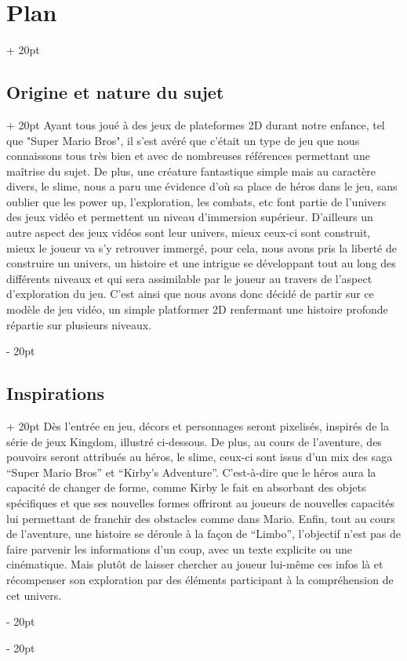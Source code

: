 \documentclass[a4paper, 12pt, twoside]{article}
\newcommand{\ind}[1][20pt]{\advance\leftskip + #1}
\newcommand{\deind}[1][20pt]{\advance\leftskip - #1}
\newenvironment{indt}[2][20pt]{#2 \par \ind[#1]}{\par \deind} %
\begin{document}
    \begin{indt}{\section{Plan}}
        \begin{indt}{\subsection{Origine et nature du sujet}}
            Ayant tous joué à des jeux de plateformes 2D durant notre enfance, tel que "Super Mario Bros", il s'est avéré que c'était un type de jeu que nous connaissons tous très bien et avec de nombreuses références permettant une maîtrise du sujet. De plus, une créature fantastique simple mais au caractère divers, le slime, nous a paru une évidence d'où sa place de héros dans le jeu, sans oublier que les power up, l'exploration, les combats, etc font partie de l'univers des jeux vidéo et permettent un niveau d'immersion supérieur. D'ailleurs un autre aspect des jeux vidéos sont leur univers, mieux ceux-ci sont construit, mieux le joueur va s'y retrouver immergé, pour cela, nous avons pris la liberté de construire un univers, un histoire et une intrigue se développant tout au long des différents niveaux et qui sera assimilable par le joueur au travers de l'aspect d'exploration du jeu. C'est ainsi que nous avons donc décidé de partir sur ce modèle de jeu vidéo, un simple platformer 2D renfermant une histoire profonde répartie sur plusieurs niveaux.
        \end{indt}

        \begin{indt}{\subsection{Inspirations}}
            Dès l'entrée en jeu, décors et personnages seront pixelisés, inspirés de la série de jeux Kingdom, illustré ci-dessous. De plus, au cours de l'aventure, des pouvoirs seront attribués au héros, le slime, ceux-ci sont issus d'un mix des saga “Super Mario Bros” et “Kirby's Adventure”. C'est-à-dire que le héros aura la capacité de changer de forme, comme Kirby le fait en absorbant des objets spécifiques et que ses nouvelles formes offriront au joueurs de nouvelles capacités lui permettant de franchir des obstacles comme dans Mario. Enfin, tout au cours de l'aventure, une histoire se déroule à la façon de “Limbo”, l'objectif n'est pas de faire parvenir les informations d'un coup, avec un texte explicite ou une cinématique. Mais plutôt de laisser chercher au joueur lui-même ces infos là et récompenser son exploration par des éléments participant à la compréhension de cet univers.
        \end{indt}


\end{indt}
\end{document}
